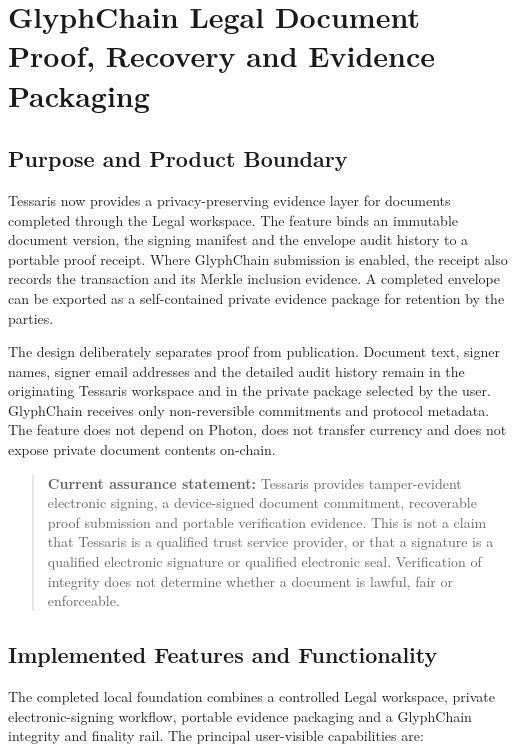 \section{GlyphChain Legal Document Proof, Recovery and Evidence Packaging}
\label{sec:glyphchain-legal-document-proof}

\subsection{Purpose and Product Boundary}

Tessaris now provides a privacy-preserving evidence layer for documents completed
through the Legal workspace.  The feature binds an immutable document version,
the signing manifest and the envelope audit history to a portable proof receipt.
Where GlyphChain submission is enabled, the receipt also records the transaction
and its Merkle inclusion evidence.  A completed envelope can be exported as a
self-contained private evidence package for retention by the parties.

The design deliberately separates proof from publication.  Document text,
signer names, signer email addresses and the detailed audit history remain in the
originating Tessaris workspace and in the private package selected by the user.
GlyphChain receives only non-reversible commitments and protocol metadata.  The
feature does not depend on Photon, does not transfer currency and does not expose
private document contents on-chain.

\begin{quote}
\textbf{Current assurance statement:} Tessaris provides tamper-evident electronic
signing, a device-signed document commitment, recoverable proof submission and
portable verification evidence.  This is not a claim that Tessaris is a qualified
trust service provider, or that a signature is a qualified electronic signature
or qualified electronic seal.  Verification of integrity does not determine
whether a document is lawful, fair or enforceable.
\end{quote}

\subsection{Implemented Features and Functionality}

The completed local foundation combines a controlled Legal workspace, private
electronic-signing workflow, portable evidence packaging and a GlyphChain
integrity and finality rail. The principal user-visible capabilities are:


